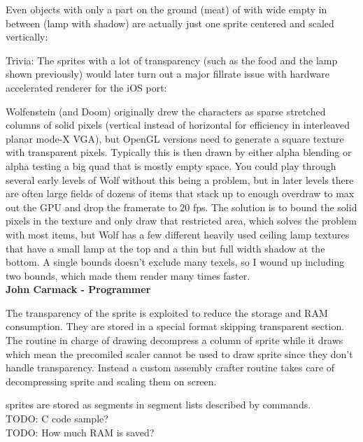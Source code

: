 Even objects with only a part on the ground (meat) of with wide empty in between (lamp with shadow) are actually just one sprite centered and scaled vertically:\\



  \begin{minipage}{.5\textwidth} 
   \end{minipage}
  \begin{minipage}{.5\textwidth} 
   \end{minipage}

\par

Trivia: The sprites with a lot of transparency (such as the food and the lamp shown previously) would later turn out a major fillrate issue with hardware accelerated renderer for the iOS port:

\begin{fancyquotes}
Wolfenstein (and Doom) originally drew the characters as sparse stretched columns of solid pixels (vertical instead of horizontal for efficiency in interleaved planar mode-X VGA), but OpenGL versions need to generate a square texture with transparent pixels.  Typically this is then drawn by either alpha blending or alpha testing a big quad that is mostly empty space.  You could play through several early levels of Wolf without this being a problem, but in later levels there are often large fields of dozens of items that stack up to enough overdraw to max out the GPU and drop the framerate to 20 fps.  The solution is to bound the solid pixels in the texture and only draw that restricted area, which solves the problem with most items, but Wolf has a few different heavily used ceiling lamp textures that have a small lamp at the top and a thin but full width shadow at the bottom.  A single bounds doesn't exclude many texels, so I wound up including two bounds, which made them render many times faster. 
\bigskip \\
\textbf{John Carmack - Programmer}
 \end{fancyquotes}

\par

The transparency of the sprite is exploited to reduce the storage and RAM consumption. They are stored in a special format skipping transparent section. The routine in charge of drawing decompress a column of sprite while it draws which mean the precomiled scaler cannot be used to draw sprite since they don't handle transparency. Instead a custom assembly crafter routine takes care of decompressing sprite and scaling them on screen.
\par
sprites are stored as segments in segment lists described by commands.\\
TODO: C code sample?\\
TODO: How much RAM is saved?\\
















